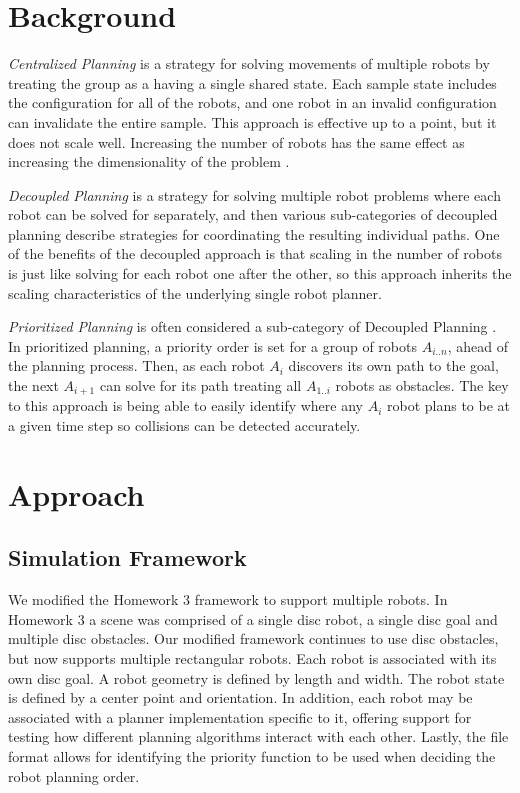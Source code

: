 \documentclass[12pt,journal,compsoc]{IEEEtran}
\begin{document}
\section{Background}
\emph{Centralized Planning} is a strategy for solving movements of multiple robots by treating the group as a having a single shared state. Each sample state includes the configuration for all of the robots, and one robot in an invalid configuration can invalidate the entire sample. This approach is effective up to a point, but it does not scale well. Increasing the number of robots has the same effect as increasing the dimensionality of the problem \cite{lavalle}.
\par
\emph{Decoupled Planning} is a strategy for solving multiple robot problems where each robot can be solved for separately, and then various sub-categories of decoupled planning describe strategies for coordinating the resulting individual paths. One of the benefits of the decoupled approach is that scaling in the number of robots is just like solving for each robot one after the other, so this approach inherits the scaling characteristics of the underlying single robot planner. 
\par
\emph{Prioritized Planning} is often considered a sub-category of Decoupled Planning \cite{lavalle}. In prioritized planning, a priority order is set for a group of robots ${A_{i..n}}$, ahead of the planning process. Then, as each robot ${A_{i}}$ discovers its own path to the goal, the next ${A_{i+1}}$ can solve for its path treating all ${A_{1..i}}$ robots as obstacles. The key to this approach is being able to easily identify where any ${A_{i}}$ robot plans to be at a given time step so collisions can be detected accurately.

\section{Approach}
\subsection{Simulation Framework}
We modified the Homework 3 framework to support multiple robots. In Homework 3 a scene was comprised of a single disc robot, a single disc goal and multiple disc obstacles. Our modified framework continues to use disc obstacles, but now supports multiple rectangular robots. Each robot is associated with its own disc goal. A robot geometry is defined by length and width. The robot state is defined by a center point and orientation. In addition, each robot may be associated with a planner implementation specific to it,  offering support for testing how different planning algorithms interact with each other. Lastly, the file format allows for identifying the priority function to be used when deciding the robot planning order.
\end{document}
